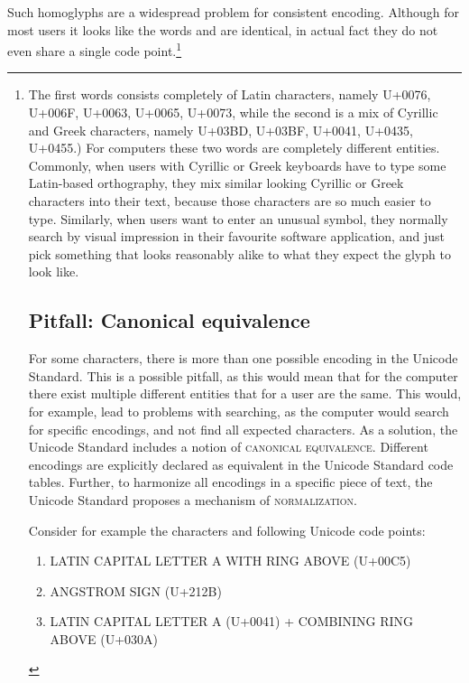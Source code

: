 {{{{{{{{{{{{{{{{{{{{{{{{{{Such homoglyphs are a widespread problem for consistent encoding. Although for most users it looks like the words and are identical, in actual fact they do not even share a single code point.\footnote{The first words consists completely of Latin characters, namely U+0076, U+006F, U+0063, U+0065, U+0073, while the second is a mix of Cyrillic and Greek characters, namely U+03BD, U+03BF, U+0041, U+0435, U+0455.) For computers these two words are completely different entities. Commonly, when users with Cyrillic or Greek keyboards have to type some Latin-based orthography, they mix similar looking Cyrillic or Greek characters into their text, because those characters are so much easier to type. Similarly, when users want to enter an unusual symbol, they normally search by visual impression in their favourite software application, and just pick something that looks reasonably alike to what they expect the glyph to look like.

\subsection{Pitfall: Canonical equivalence}\label{pitfall-canonical-equivalence}

For some characters, there is more than one possible encoding in the Unicode Standard. This is a possible pitfall, as this would mean that for the computer there exist multiple different entities that for a user are the same. This would, for example, lead to problems with searching, as the computer would search for specific encodings, and not find all expected characters. As a solution, the Unicode Standard includes a notion of \textsc{canonical equivalence}. Different encodings are explicitly declared as equivalent in the Unicode Standard code tables. Further, to harmonize all encodings in a specific piece of text, the Unicode Standard proposes a mechanism of \textsc{normalization}.

Consider for example the characters and following Unicode code points:
\begin{enumerate}
	\def\labelenumi{\arabic{enumi}.} 
	\item LATIN CAPITAL LETTER A WITH RING ABOVE (U+00C5) 
	\item ANGSTROM SIGN (U+212B) 
	\item LATIN CAPITAL LETTER A (U+0041) + COMBINING RING ABOVE (U+030A) 
\end{enumerate}

}}}}}}}}}}}}}}}}}}}}}}}}}}}

